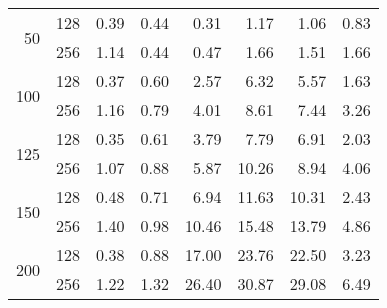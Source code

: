 \begin{table}[htb]
{\begin{tabular}{|r|r|rrrr|r|r|}
\multicolumn{1}{|r|}{\multirow{2}{*}{50}}  & 128       & 0.39                       & 0.44                     & 0.31                    & 1.17       & 1.06                      & 0.83     \\
\multicolumn{1}{|r|}{}                     & 256       & 1.14                       & 0.44                     & 0.47                    & 1.66       & 1.51                      & 1.66     \\ \hline
\multicolumn{1}{|r|}{\multirow{2}{*}{100}} & 128       & 0.37                       & 0.60                     & 2.57                    & 6.32       & 5.57                      & 1.63     \\
\multicolumn{1}{|r|}{}                     & 256       & 1.16                       & 0.79                     & 4.01                    & 8.61       & 7.44                      & 3.26     \\ \hline
\multicolumn{1}{|r|}{\multirow{2}{*}{125}} & 128       & 0.35                       & 0.61                     & 3.79                    & 7.79       & 6.91                      & 2.03     \\
\multicolumn{1}{|r|}{}                     & 256       & 1.07                       & 0.88                     & 5.87                    & 10.26      & 8.94                      & 4.06     \\ \hline
\multicolumn{1}{|r|}{\multirow{2}{*}{150}} & 128       & 0.48                       & 0.71                     & 6.94                    & 11.63      & 10.31                     & 2.43     \\
\multicolumn{1}{|r|}{}                     & 256       & 1.40                       & 0.98                     & 10.46                   & 15.48      & 13.79                     & 4.86     \\ \hline
\multicolumn{1}{|r|}{\multirow{2}{*}{200}} & 128       & 0.38                       & 0.88                     & 17.00                   & 23.76      & 22.50                     & 3.23     \\
\multicolumn{1}{|r|}{}                     & 256       & 1.22                       & 1.32                     & 26.40                   & 30.87      & 29.08                     & 6.49     \\ \hline

\end{tabular}}
\end{table}
